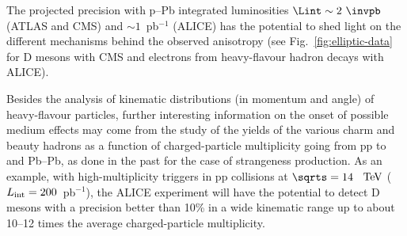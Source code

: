 The projected precision with p--Pb integrated luminosities $\Lint\sim 2~\invpb$  (ATLAS and CMS) and $\sim 1$~pb$^{-1}$ (ALICE) has the potential to shed light on the different mechanisms behind the observed anisotropy (see Fig.~\ref{fig:elliptic-data} for D mesons with CMS and electrons from heavy-flavour hadron decays with ALICE).


Besides the analysis of kinematic distributions (in momentum and angle) of heavy-flavour particles, further interesting information on the onset of possible medium effects may come from the study of the yields of the various charm and beauty hadrons as a function of charged-particle multiplicity going from pp to \pPb and Pb--Pb, as done in the past for the case of strangeness production. As an example, with high-multiplicity triggers in pp collisions at $\sqrts =14$~$~\text{TeV}$ ($L_{\rm int}=200$~pb$^{-1}$), the ALICE experiment will have the potential to detect D mesons with a precision better than 10\% in a wide kinematic range up to about 10--12 times the average charged-particle multiplicity. 






